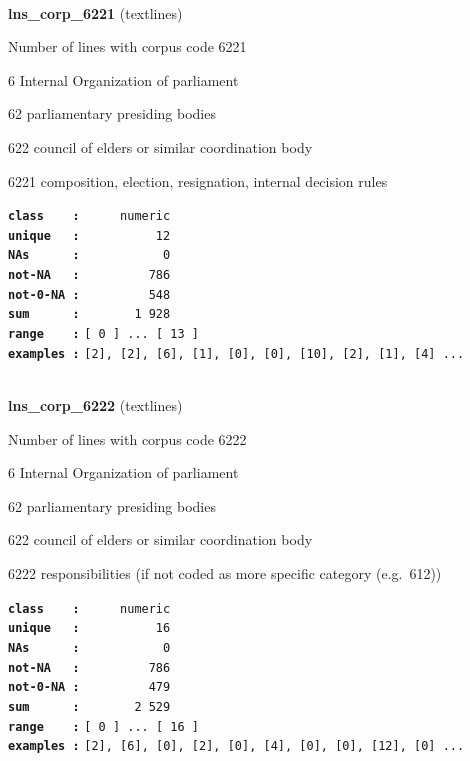 \documentclass[]{article}
\begin{document}
~

\textbf{lns\_corp\_6221} (textlines)

Number of lines with corpus code 6221

6 Internal Organization of parliament

62 parliamentary presiding bodies

622 council of elders or similar coordination body

6221 composition, election, resignation, internal decision rules

\textbf{\texttt{class\ \ \ \ :}} \texttt{~~~~~numeric}\\
\textbf{\texttt{unique\ \ \ :}} \texttt{~~~~~~~~~~12}\\
\textbf{\texttt{NAs\ \ \ \ \ \ :}} \texttt{~~~~~~~~~~~0}\\
\textbf{\texttt{not-NA\ \ \ :}} \texttt{~~~~~~~~~786}\\
\textbf{\texttt{not-0-NA\ :}} \texttt{~~~~~~~~~548}\\
\textbf{\texttt{sum\ \ \ \ \ \ :}} \texttt{~~~~~~~1~928}\\
\textbf{\texttt{range\ \ \ \ :}}
\texttt{{[}\ 0\ {]}\ ...\ {[}\ 13\ {]}}\\
\textbf{\texttt{examples\ :}}
\texttt{{[}2{]},\ {[}2{]},\ {[}6{]},\ {[}1{]},\ {[}0{]},\ {[}0{]},\ {[}10{]},\ {[}2{]},\ {[}1{]},\ {[}4{]}\ ...}\\

~

\textbf{lns\_corp\_6222} (textlines)

Number of lines with corpus code 6222

6 Internal Organization of parliament

62 parliamentary presiding bodies

622 council of elders or similar coordination body

6222 responsibilities (if not coded as more specific category
(e.g.~612))

\textbf{\texttt{class\ \ \ \ :}} \texttt{~~~~~numeric}\\
\textbf{\texttt{unique\ \ \ :}} \texttt{~~~~~~~~~~16}\\
\textbf{\texttt{NAs\ \ \ \ \ \ :}} \texttt{~~~~~~~~~~~0}\\
\textbf{\texttt{not-NA\ \ \ :}} \texttt{~~~~~~~~~786}\\
\textbf{\texttt{not-0-NA\ :}} \texttt{~~~~~~~~~479}\\
\textbf{\texttt{sum\ \ \ \ \ \ :}} \texttt{~~~~~~~2~529}\\
\textbf{\texttt{range\ \ \ \ :}}
\texttt{{[}\ 0\ {]}\ ...\ {[}\ 16\ {]}}\\
\textbf{\texttt{examples\ :}}
\texttt{{[}2{]},\ {[}6{]},\ {[}0{]},\ {[}2{]},\ {[}0{]},\ {[}4{]},\ {[}0{]},\ {[}0{]},\ {[}12{]},\ {[}0{]}\ ...}\\
\end{document}
